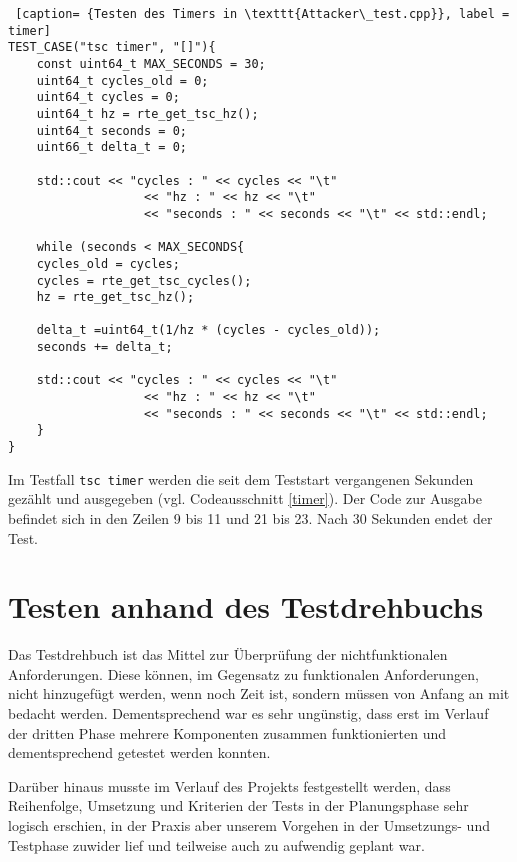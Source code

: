 \documentclass[../review_3.tex]{subfiles}
\begin{document}
\begin{lstlisting} [caption= {Testen des Timers in \texttt{Attacker\_test.cpp}}, label = timer]
TEST_CASE("tsc timer", "[]"){
    const uint64_t MAX_SECONDS = 30;
    uint64_t cycles_old = 0;
    uint64_t cycles = 0;
    uint64_t hz = rte_get_tsc_hz();
    uint64_t seconds = 0;
    uint66_t delta_t = 0;
    
    std::cout << "cycles : " << cycles << "\t"
                   << "hz : " << hz << "\t"
                   << "seconds : " << seconds << "\t" << std::endl;
    
    while (seconds < MAX_SECONDS{
    cycles_old = cycles;
    cycles = rte_get_tsc_cycles();
    hz = rte_get_tsc_hz();
    
    delta_t =uint64_t(1/hz * (cycles - cycles_old));
    seconds += delta_t;
    
    std::cout << "cycles : " << cycles << "\t"
                   << "hz : " << hz << "\t"
                   << "seconds : " << seconds << "\t" << std::endl;
    }
} \end{lstlisting}
Im Testfall \texttt{tsc timer} werden die seit dem Teststart vergangenen Sekunden gezählt und ausgegeben (vgl. Codeausschnitt \ref{timer}). Der Code zur Ausgabe befindet sich in den Zeilen 9 bis 11 und 21 bis 23.
Nach 30 Sekunden endet der Test. %

\section{Testen anhand des Testdrehbuchs}

\label{tdblabel}

	Das Testdrehbuch ist das Mittel zur Überprüfung der nichtfunktionalen Anforderungen. 
	Diese können, im Gegensatz zu funktionalen Anforderungen, nicht hinzugefügt werden, wenn noch Zeit ist, sondern müssen von Anfang an mit bedacht werden. 
	Dementsprechend war es sehr ungünstig, dass erst im Verlauf der dritten Phase mehrere Komponenten zusammen funktionierten und dementsprechend getestet werden konnten.
	
	Darüber hinaus musste im Verlauf des Projekts festgestellt werden, dass Reihenfolge, Umsetzung und Kriterien der Tests in der Planungsphase sehr logisch erschien, in der Praxis aber unserem Vorgehen in der Umsetzungs- und Testphase zuwider lief und teilweise auch zu aufwendig geplant war. 
\end{document}
